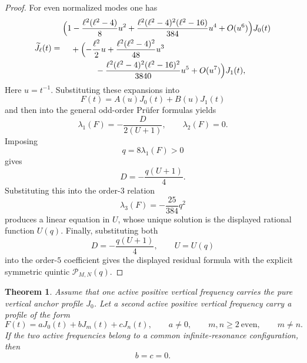 \documentclass[11pt,reqno]{amsart}
\newtheorem{theorem}{Theorem}[section]
\theoremstyle{definition}
\begin{document}
\begin{proof}
For even normalized modes one has
\[
\widetilde J_\ell(t)
=
\begin{aligned}
&\Bigl(
1-\frac{\ell^2(\ell^2-4)}{8}u^2
+\frac{\ell^2(\ell^2-4)^2(\ell^2-16)}{384}u^4
+O(u^6)
\Bigr)J_0(t)
\\
&\quad+
\Bigl(
-\frac{\ell^2}{2}u
+\frac{\ell^2(\ell^2-4)^2}{48}u^3
\\
&\qquad\qquad
-\frac{\ell^2(\ell^2-4)^2(\ell^2-16)^2}{3840}u^5
+O(u^7)
\Bigr)J_1(t),
\end{aligned}
\]
Here $u=t^{-1}$.
Substituting these expansions into
\[
F(t)=A(u)J_0(t)+B(u)J_1(t)
\]
and then into the general odd-order Pr\"ufer formulas yields
\[
\lambda_1(F)=-\frac{D}{2(U+1)},
\qquad
\lambda_2(F)=0.
\]
Imposing
\[
q=8\lambda_1(F)>0
\]
gives
\[
D=-\frac{q(U+1)}4.
\]
Substituting this into the order-$3$ relation
\[
\lambda_3(F)=-\frac{25}{384}q^2
\]
produces a linear equation in $U$, whose unique solution is the displayed rational function
$U(q)$. Finally, substituting both
\[
D=-\frac{q(U+1)}4,
\qquad
U=U(q)
\]
into the order-$5$ coefficient gives the displayed residual formula with the explicit symmetric
quintic $\mathcal P_{M,N}(q)$.
\end{proof}

\begin{theorem}\label{thm:anchor-eveneven-rigidity}
Assume that one active positive vertical frequency carries the pure vertical anchor profile
$J_0$. Let a second active positive vertical frequency carry a profile of the form
\[
F(t)=aJ_0(t)+bJ_m(t)+cJ_n(t),
\qquad
a\neq 0,
\qquad
m,n\ge 2\ \text{even},
\qquad
m\neq n.
\]
If the two active frequencies belong to a common infinite-resonance configuration, then
\[
b=c=0.
\]
\end{theorem}
\end{document}
